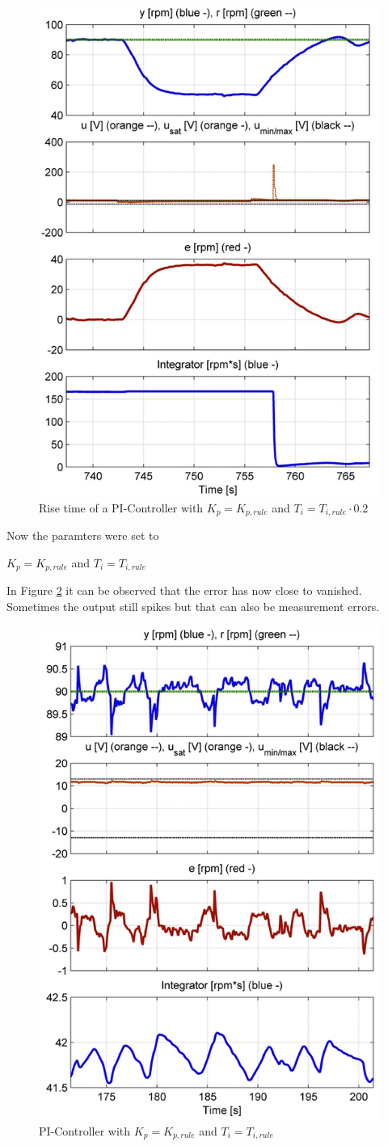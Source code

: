 \begin{figure}[H]
\begin{center}
\includegraphics[width=0.5\linewidth]{images/general/PI/PI_RiseTime02}
\end{center}
\caption{Rise time of a PI-Controller with $K_{p}= K_{p,rule}$ and $T_i = T_{i,rule}\cdot0.2$}
\label{fig:PI_RiseTime02}
\end{figure}

Now the paramters were set to

\begin{center}
{$K_{p} = K_{p,rule}$ and $T_{i} = T_{i,rule}$}
\end{center}

In Figure \ref{fig:PI_Controller1} it can be observed that the error has now close to vanished. Sometimes the output still spikes but that can also be measurement errors.

\begin{figure}[H]
\begin{center}
\includegraphics[width=0.5\linewidth]{images/general/PI/PI_Controller1}
\end{center}
\caption{PI-Controller with $K_{p} = K_{p,rule}$ and $T_{i} = T_{i,rule}$}
\label{fig:PI_Controller1}
\end{figure}

